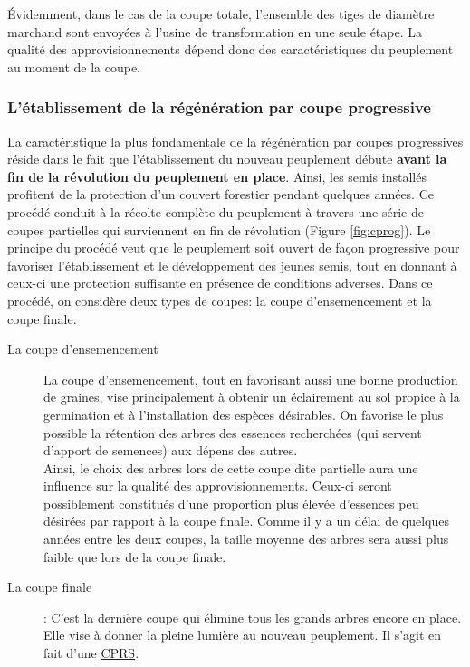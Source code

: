 Évidemment, dans le cas de la coupe totale, l'ensemble des tiges de diamètre marchand sont envoyées à l'usine de transformation en une seule étape. La qualité des approvisionnements dépend donc des caractéristiques du peuplement au moment de la coupe.

\subsubsection{L'établissement de la régénération par coupe progressive}\label{cprog}

La caractéristique la plus fondamentale de la régénération par coupes progressives réside dans le fait que l'établissement du nouveau peuplement débute \textbf{avant la fin de la révolution du peuplement en place}. Ainsi, les semis installés profitent de la protection d'un couvert forestier pendant quelques années. Ce procédé conduit à la récolte complète du peuplement à travers une série de coupes partielles qui surviennent en fin de révolution (Figure \ref{fig:cprog}). Le principe du procédé veut que le peuplement soit ouvert de façon progressive pour favoriser l'établissement et le développement des jeunes semis, tout en donnant à ceux-ci une protection suffisante en présence de conditions adverses. Dans ce procédé, on considère deux types de coupes: la coupe d'ensemencement et la coupe finale.

\begin{description}
\item[La coupe d'ensemencement] La coupe d'ensemencement, tout en favorisant aussi une bonne production de graines, vise principalement à obtenir un éclairement au sol propice à la germination et à l'installation des espèces désirables. On favorise le plus possible la rétention des arbres des essences recherchées (qui servent d'apport de semences) aux dépens des autres.\\ 

Ainsi, le choix des arbres lors de cette coupe dite \og partielle \fg aura une influence sur la qualité des approvisionnements. Ceux-ci seront possiblement constitués d'une proportion plus élevée d'essences peu désirées par rapport à la coupe finale. Comme il y a un délai de quelques années entre les deux coupes, la taille moyenne des arbres sera aussi plus faible que lors de la coupe finale. 

\item[La coupe finale] : C'est la dernière coupe qui élimine tous les grands arbres encore en place. Elle vise à donner la pleine lumière au nouveau peuplement. Il s'agit en fait d'une \hyperref[cprs]{CPRS}.
\end{description}

